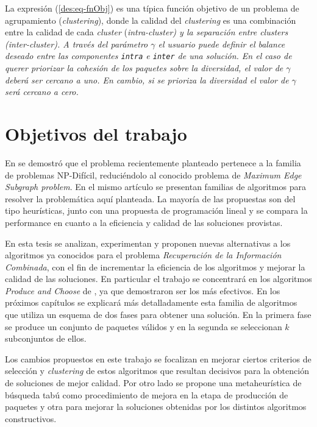 La expresión (\ref{des:eq-fnObj}) es una típica función objetivo de un problema de agrupamiento ({\em clustering}), donde la calidad del {\em clustering} es una combinación entre la calidad de cada {\em cluster} (\em{intra-cluster}) y la separación entre {\em clusters} (\em{inter-cluster}). A través del parámetro $\gamma$ el usuario puede definir el balance deseado entre las componentes \texttt{intra} e \texttt{inter} de una solución. En el caso de querer priorizar la cohesión de los paquetes sobre la diversidad, el  valor de $\gamma$ deberá ser cercano a uno. En cambio, si se prioriza la diversidad el valor de $\gamma$ será cercano a cero.

\section{Objetivos del trabajo}
En \cite{journals/tkde/Amer-YahiaBCFMZ14} se demostró que el problema recientemente planteado pertenece a la familia de problemas NP-Difícil, reduciéndolo al conocido problema de {\em Maximum Edge Subgraph problem}. En el mismo artículo se presentan familias de algoritmos para resolver la problemática aquí planteada. La mayoría de las propuestas son del tipo heurísticas, junto con una propuesta de programación lineal y se compara la performance en cuanto a la eficiencia y calidad de las soluciones provistas.

En esta tesis se analizan, experimentan y proponen nuevas alternativas a los algoritmos ya conocidos para el problema {\em Recuperación de la Información Combinada}, con el fin de incrementar la eficiencia de los algoritmos y mejorar la calidad de las soluciones. En particular el trabajo se concentrará en los algoritmos {\em Produce and Choose} de \cite{journals/tkde/Amer-YahiaBCFMZ14}, ya que demostraron ser los más efectivos. En los próximos capítulos se explicará más detalladamente esta familia de algoritmos que utiliza un esquema de dos fases para obtener una solución. En la primera fase se produce un conjunto de paquetes válidos y en la segunda se seleccionan $k$ subconjuntos de ellos.

Los cambios propuestos en este trabajo se focalizan en mejorar ciertos criterios de selección y {\em clustering} de estos algoritmos que resultan decisivos para la obtención de soluciones de mejor calidad. Por otro lado se propone una metaheurística de búsqueda tabú como procedimiento de mejora en la etapa de producción de paquetes y otra para mejorar la soluciones obtenidas por los distintos algoritmos constructivos.

